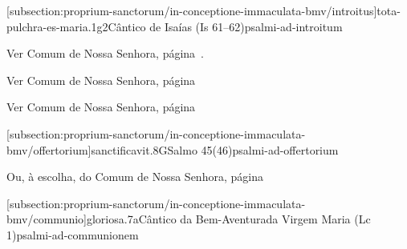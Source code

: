 \def\Prefix{subsection:proprium-sanctorum/in-conceptione-immaculata-bmv}

[\Prefix/introitus]{tota-pulchra-es-maria.1g2}{Cântico de Isaías (Is 61--62)}{psalmi-ad-introitum}

\begin{rubrica}
  Ver Comum de Nossa Senhora, página~\pageref{subsection:communia/commune-bmv/psalmus-responsorius}.
\end{rubrica}

\begin{rubrica}
  Ver Comum de Nossa Senhora, página~\pageref{subsection:communia/commune-bmv/alleluia}
\end{rubrica}

\begin{rubrica}
  Ver Comum de Nossa Senhora, página~\pageref{subsection:communia/commune-bmv/psalmus-alleluiaticus}
\end{rubrica}

\AllowPageFlush

[\Prefix/offertorium]{sanctificavit.8G}{Salmo 45(46)}{psalmi-ad-offertorium}

\begin{rubrica}
  Ou, à escolha, do Comum de Nossa Senhora, página~\pageref{subsection:communia/commune-bmv/offertorium}
\end{rubrica}

\AllowPageFlush

[\Prefix/communio]{gloriosa.7a}{Cântico da Bem-Aventurada Virgem Maria (Lc 1)}{psalmi-ad-communionem}